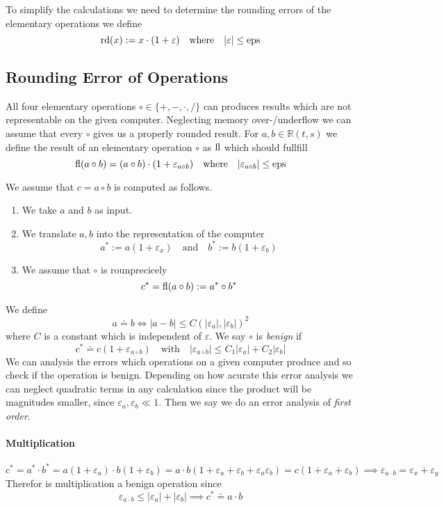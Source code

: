 To simplify the calculations we need to determine the rounding errors of the elementary operations we define
\[\operatorname{rd}(x) := x \cdot (1 + \varepsilon) \quad\text{where}\quad |\varepsilon| \leq \operatorname{eps}\]

\subsection{Rounding Error of Operations}
All four elementary operations \(\circ \in \{+, -, \cdot, /\}\) can produces results which are not representable on the given computer.
Neglecting memory over-/underflow we can assume that every \(\circ\) gives us a properly rounded result.
For \(a, b \in \mathbb{R}(t, s)\) we define the result of an elementary operation \(\circ\) as \(\operatorname{fl}\) which should fullfill
\[\operatorname{fl}(a \circ b) = (a \circ b) \cdot (1 + \varepsilon_{a \circ b}) \quad\text{where}\quad |\varepsilon_{a \circ b}| \leq \operatorname{eps}\]

We assume that \(c = a \circ b\) is computed as follows.
\begin{enumerate}
   \item We take \(a\) and \(b\) as input.
   \item We translate \(a, b\) into the representation of the computer
      \[a^\ast := a(1 + \varepsilon_x) \quad\text{and}\quad b^\ast := b(1 + \varepsilon_b)\]
   \item We assume that \(\circ\) is rounprecicely
      \[c^\ast = \operatorname{fl}(a \circ b) := a^\ast \circ b^\ast\]
\end{enumerate}

We define
\[a \doteq b \iff |a - b| \leq C (|\varepsilon_a|, |\varepsilon_b|)^2\]
where \(C\) is a constant which is independent of \(\varepsilon\).
We say \(\circ\) is \emph{benign} if
\[c^\ast \doteq c(1 + \varepsilon_{a \circ b}) \quad\text{with}\quad |\varepsilon_{a \circ b}| \leq C_1|\varepsilon_a| + C_2|\varepsilon_b|\]
We can analysis the errors which operations on a given computer produce and so check if the operation is benign.
Depending on how acurate this error analysis we can neglect quadratic terms in any calculation since the product will be magnitudes smaller, since \(\varepsilon_a, \varepsilon_b \ll 1\).
Then we say we do an error analysis of \emph{first order}.

\paragraph{Multiplication}
\[c^\ast = a^\ast \cdot b^\ast = a(1 + \varepsilon_a) \cdot b(1 + \varepsilon_b) = a \cdot b (1 + \varepsilon_a + \varepsilon_b + \varepsilon_a\varepsilon_b) = c(1 + \varepsilon_a + \varepsilon_b) \implies \varepsilon_{a \cdot b} = \varepsilon_x + \varepsilon_y\]
Therefor is multiplication a benign operation since
\[\varepsilon_{a \cdot b} \leq |\varepsilon_a| + |\varepsilon_b| \implies c^\ast \doteq a \cdot b\]

